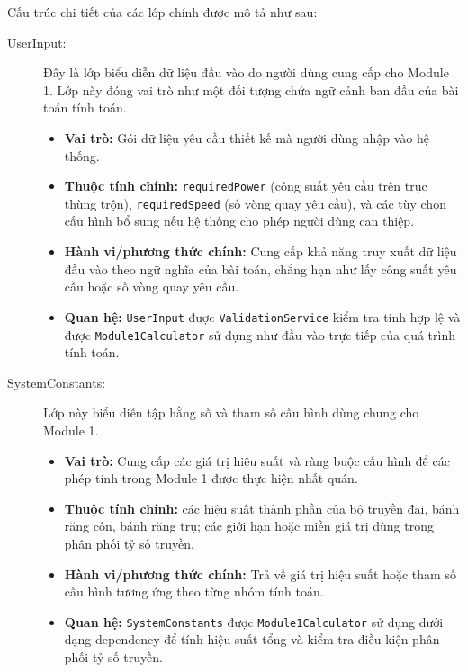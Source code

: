 \documentclass[a4paper]{article}
\begin{document}
Cấu trúc chi tiết của các lớp chính được mô tả như sau:

\begin{description}
    \item[UserInput:]
    Đây là lớp biểu diễn dữ liệu đầu vào do người dùng cung cấp cho Module 1. Lớp này đóng vai trò như một đối tượng chứa ngữ cảnh ban đầu của bài toán tính toán.
    \begin{itemize}
        \item \textbf{Vai trò:} Gói dữ liệu yêu cầu thiết kế mà người dùng nhập vào hệ thống.
        \item \textbf{Thuộc tính chính:} \texttt{requiredPower} (công suất yêu cầu trên trục thùng trộn), \texttt{requiredSpeed} (số vòng quay yêu cầu), và các tùy chọn cấu hình bổ sung nếu hệ thống cho phép người dùng can thiệp.
        \item \textbf{Hành vi/phương thức chính:} Cung cấp khả năng truy xuất dữ liệu đầu vào theo ngữ nghĩa của bài toán, chẳng hạn như lấy công suất yêu cầu hoặc số vòng quay yêu cầu.
        \item \textbf{Quan hệ:} \texttt{UserInput} được \texttt{ValidationService} kiểm tra tính hợp lệ và được \texttt{Module1Calculator} sử dụng như đầu vào trực tiếp của quá trình tính toán.
    \end{itemize}

    \item[SystemConstants:]
    Lớp này biểu diễn tập hằng số và tham số cấu hình dùng chung cho Module 1.
    \begin{itemize}
        \item \textbf{Vai trò:} Cung cấp các giá trị hiệu suất và ràng buộc cấu hình để các phép tính trong Module 1 được thực hiện nhất quán.
        \item \textbf{Thuộc tính chính:} các hiệu suất thành phần của bộ truyền đai, bánh răng côn, bánh răng trụ; các giới hạn hoặc miền giá trị dùng trong phân phối tỷ số truyền.
        \item \textbf{Hành vi/phương thức chính:} Trả về giá trị hiệu suất hoặc tham số cấu hình tương ứng theo từng nhóm tính toán.
        \item \textbf{Quan hệ:} \texttt{SystemConstants} được \texttt{Module1Calculator} sử dụng dưới dạng dependency để tính hiệu suất tổng và kiểm tra điều kiện phân phối tỷ số truyền.
    \end{itemize}


\end{description}
\end{document}
